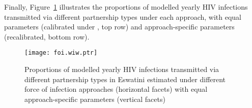 \par
Finally, Figure~\ref{fig:foi.wiw.ptr} illustrates
the proportions of modelled yearly HIV infections
transmitted via different partnership types under each approach, with
equal parameters (calibrated under \epa, top row) and
approach-specific parameters (recalibrated, bottom row).
\begin{figure}[h]
  \texttt{[image: foi.wiw.ptr]}
  \caption{Proportions of modelled yearly HIV infections
    transmitted via different partnership types in Eswatini
    estimated under different force of infection approaches (horizontal facets)
    with equal \vs approach-specific parameters (vertical facets)}
  \label{fig:foi.wiw.ptr}
\end{figure}
